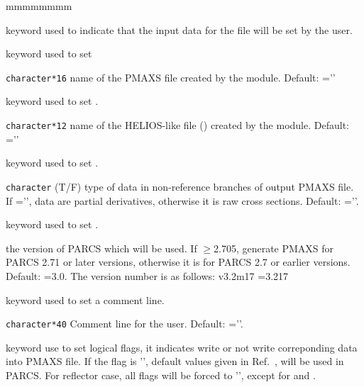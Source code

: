 \begin{ListeDeDescription}{mmmmmmmm}
\item[\moc{GENPMAXS}]keyword used to indicate that the input data for the  file will be set by the user.

\item[\moc{JOB$\_$TIT}]   keyword used to set 

\item[\dusa{jobtit}] \texttt{character*16} name of the PMAXS file created by the  module. Default: =''

\item[\moc{FILE$\_$NAME}]   keyword used to set  .

\item[\dusa{fname}] \texttt{character*12} name of the HELIOS-like file () created by the  module. Default: =''

\item[\moc{DERIVATIVE}]   keyword used to set .

\item[\dusa{der}] \texttt{character} (T/F) type of data in non-reference branches of output PMAXS file. If ='', data are partial derivatives, otherwise it is raw cross sections. Default: =''.

\item[\moc{VERSION}]   keyword used to set .

\item[\dusa{vers}] the version of PARCS which will be used. If $\geq$2.705, generate PMAXS for PARCS 2.71 or later versions, otherwise it is for PARCS 2.7 or earlier versions. Default: =3.0. The version number is as follows: v3.2m17 =3.217

\item[\moc{COMMENT}]   keyword used to set a comment line.

\item[\dusa{comment}] \texttt{character*40} Comment line for the user. Default: =''.

\item[\moc{JOB$\_$OPT}]   keyword use to set logical flags, it indicates write or not write correponding data into PMAXS file. If the flag is '', default values given in Ref.~, will be used in PARCS. For reflector case, all flags will be forced to '', except for  and .


\end{ListeDeDescription}

